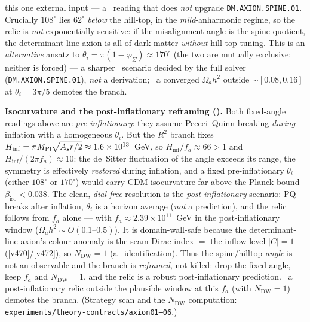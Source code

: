 this one external input --- a \mC\ reading that does \emph{not} upgrade \texttt{DM.AXION.SPINE.01}.
Crucially $108^\circ$ lies $62^\circ$ \emph{below} the hill-top,
in the \emph{mild}-anharmonic regime, so the relic is \emph{not} exponentially sensitive: if the
misalignment angle is the spine quotient, the determinant-line axion is all of dark matter \emph{without}
hill-top tuning. This is an \emph{alternative} ansatz to $\theta_i=\pi(1-\varphi_\Sigma)\approx170^\circ$
(the two are mutually exclusive; neither is forced) --- a sharper \mC\ scenario decided by the full solver
(\texttt{DM.AXION.SPINE.01}), \emph{not} a derivation; \mX\ a converged $\Omega_a h^2$ outside ${\sim}[0.08,0.16]$
at $\theta_i=3\pi/5$ demotes the branch.

\par\smallskip\noindent\textbf{Isocurvature and the post-inflationary reframing (\mC).}
Both fixed-angle readings above are \emph{pre-inflationary}: they assume Peccei--Quinn breaking
\emph{during} inflation with a homogeneous $\theta_i$. But the $R^2$ branch fixes
$H_{\mathrm{inf}}=\pi M_{\mathrm{Pl}}\sqrt{A_s r/2}\approx1.6\times10^{13}$~GeV, so $H_{\mathrm{inf}}/f_a\approx66>1$
and $H_{\mathrm{inf}}/(2\pi f_a)\approx10$: the de~Sitter fluctuation of the angle exceeds its range, the
symmetry is effectively \emph{restored} during inflation, and a fixed pre-inflationary $\theta_i$ (either
$108^\circ$ or $170^\circ$) would carry CDM isocurvature far above the Planck bound
$\beta_{\mathrm{iso}}<0.038$. The clean, \emph{dial-free} resolution is the \emph{post-inflationary}
scenario: PQ breaks after inflation, $\theta_i$ is a horizon average (\emph{not} a prediction), and the
relic follows from $f_a$ alone --- with $f_a\approx2.39\times10^{11}$~GeV in the post-inflationary window
($\Omega_a h^2\sim O(0.1\text{--}0.5)$). It is domain-wall-safe because the determinant-line axion's colour
anomaly is the seam Dirac index $=$ the inflow level $|C|=1$ (\vref{v470}/\vref{v472}), so
$N_{\mathrm{DW}}=1$ (a \mC\ identification). Thus the spine/hilltop \emph{angle} is not an observable and
the branch is \emph{reframed}, not killed: drop the fixed angle, keep $f_a$ and $N_{\mathrm{DW}}=1$, and the
relic is a robust post-inflationary prediction. \mX\ a post-inflationary relic outside the plausible window
at this $f_a$ (with $N_{\mathrm{DW}}=1$) demotes the branch. (Strategy scan and the $N_{\mathrm{DW}}$
computation: \texttt{experiments/theory-contracts/axion01--06}.)

